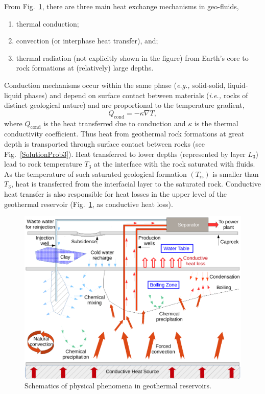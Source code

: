\documentclass[12pts,a4paper,amsmath,amssymb,floatfix]{article}%
\newcommand{\ie}{{\em{i.e., }}}
\newcommand{\eg}{{\em{e.g., }}}
\begin{document}
\begin{enumerate}[label=\bfseries Problem \arabic*:]
\begin{enumerate}
      From Fig.~\ref{SolutionProb2}, there are three main heat exchange mechanisms in geo-fluids,
      \begin{enumerate}
         \item thermal conduction;
         \item convection (or interphase heat transfer), and;
         \item thermal radiation (not explicitly shown in the figure) from Earth's core to rock formations at (relatively) large depths.
      \end{enumerate}
      Conduction mechanisms occur within the same phase (\eg solid-solid, liquid-liquid phases) and depend on surface contact between materials (\ie rocks of distinct geological nature) and are proportional to the temperature gradient,
      \begin{equation}
          Q_{\text{cond}} = - \kappa\nabla T,
      \end{equation}
      where $Q_{\text{cond}}$ is the heat transferred due to conduction and $\kappa$ is the thermal conductivity coefficient.  Thus heat from geothermal rock formations at great depth is transported through surface contact between rocks (see Fig.~\ref{SolutionProb3}). Heat transferred to lower depths (represented by layer $L_{3}$) lead to rock temperature $T_{3}$ at the interface with the rock saturated with fluids. As the temperature of such saturated geological formation $\left(T_{\text{rs}}\right)$ is smaller than $T_{3}$, heat is transferred from the interfacial layer to the saturated rock. Conductive heat transfer is also responsible for heat losses in the upper level of the geothermal reservoir (Fig.~\ref{SolutionProb2}, as conductive heat loss). 
      
      \begin{figure}[h]%
        \begin{center}
          \includegraphics[width=\columnwidth, clip]{./Pics/GeothermalOverviewDiagram}
        \end{center}
        \caption{Schematics of physical phenomena in geothermal reservoirs.}\label{SolutionProb2}
      \end{figure}


\end{enumerate}
\end{enumerate}
\end{document}
